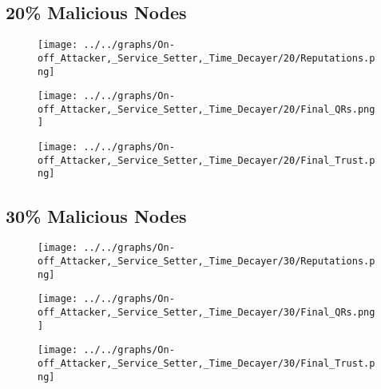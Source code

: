 \begin{minipage}[t]{0.49\columnwidth}
\subsection*{20\% Malicious Nodes}
    \begin{figure}[H]
        \centering
        \texttt{[image: ../../graphs/On-off\_Attacker,\_Service\_Setter,\_Time\_Decayer/20/Reputations.png]}
    \end{figure}
    \begin{figure}[H]
        \centering
        \texttt{[image: ../../graphs/On-off\_Attacker,\_Service\_Setter,\_Time\_Decayer/20/Final\_QRs.png]}
    \end{figure}
\end{minipage}
\begin{minipage}[t]{0.49\columnwidth}
    \begin{figure}[H]
        \centering
        \texttt{[image: ../../graphs/On-off\_Attacker,\_Service\_Setter,\_Time\_Decayer/20/Final\_Trust.png]}
    \end{figure}
\end{minipage}

\begin{minipage}[t]{0.49\columnwidth}
\subsection*{30\% Malicious Nodes}
    \begin{figure}[H]
        \centering
        \texttt{[image: ../../graphs/On-off\_Attacker,\_Service\_Setter,\_Time\_Decayer/30/Reputations.png]}
    \end{figure}
    \begin{figure}[H]
        \centering
        \texttt{[image: ../../graphs/On-off\_Attacker,\_Service\_Setter,\_Time\_Decayer/30/Final\_QRs.png]}
    \end{figure}
\end{minipage}
\begin{minipage}[t]{0.49\columnwidth}
    \begin{figure}[H]
        \centering
        \texttt{[image: ../../graphs/On-off\_Attacker,\_Service\_Setter,\_Time\_Decayer/30/Final\_Trust.png]}
    \end{figure}
\end{minipage}

